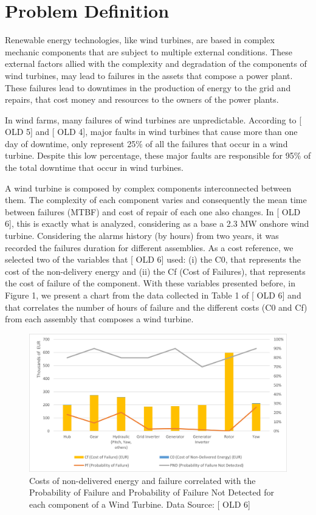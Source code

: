 \section{Problem Definition} 
\label{sub:if_you_use_this_template} 

Renewable energy technologies, like wind turbines, are based in complex mechanic components that are subject to multiple external conditions. These external factors allied with the complexity and degradation of the components of wind turbines, may lead to failures in the assets that compose a power plant. These failures lead to downtimes in the production of energy to the grid and repairs, that cost money and resources to the owners of the power plants.

In wind farms, many failures of wind turbines are unpredictable. According to [ OLD 5] and [ OLD 4], major faults in wind turbines that cause more than one day of downtime, only represent 25\%  of all the failures that occur in a wind turbine. Despite this low percentage, these major faults are responsible for 95\%  of the total downtime that occur in wind turbines.

A wind turbine is composed by complex components interconnected between them. The complexity of each component varies and consequently the mean time between failures (MTBF) and cost of repair of each one also changes. In [ OLD 6], this is exactly what is analyzed, considering as a base a 2.3 MW onshore wind turbine. Considering the alarms history (by hours) from two years, it was recorded the failures duration for different assemblies. As a cost reference, we selected two of the variables that [ OLD 6] used: (i) the C0, that represents the cost of the non-delivery energy and (ii) the Cf (Cost of Failures), that represents the cost of failure of the component. With these variables presented before, in Figure 1, we present a chart from the data collected in Table 1 of [ OLD 6] and that correlates the number of hours of failure and the different costs (C0 and Cf) from each assembly that composes a wind turbine.

\begin{figure}[htbp]
	\centering
	\includegraphics[scale=0.8]{Chapters/Figures/introduction_fig1.png}
	\caption{Costs of non-delivered energy and failure correlated with the Probability of Failure and Probability of Failure Not Detected for each component of a Wind Turbine. Data Source: [ OLD 6]}
	\label{fig:Figuras_Tree_silhouettes-vectorial}
\end{figure}

